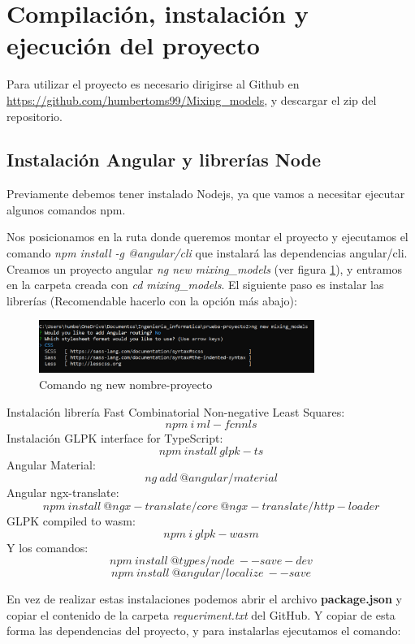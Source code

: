 \section{Compilación, instalación y ejecución del proyecto}

Para utilizar el proyecto es necesario dirigirse al Github en \url{https://github.com/humbertoms99/Mixing_models}, y descargar el zip del repositorio.

\subsection{Instalación Angular y librerías Node}

Previamente debemos tener instalado Nodejs, ya que vamos a necesitar ejecutar algunos comandos npm.

Nos posicionamos en la ruta donde queremos montar el proyecto y ejecutamos el comando \textit{npm install -g @angular/cli} que instalará las dependencias angular/cli.
Creamos un proyecto angular \textit{ng new mixing\_models} (ver figura \ref{fig:ng_new}), y entramos en la carpeta creada con \textit{cd mixing\_models}. El siguiente paso es instalar las librerías (Recomendable hacerlo con la opción más abajo): \\


\begin{figure}[h!] 
\centering
    \includegraphics[width=0.8\textwidth]{img/ng_new.PNG}
\caption{Comando ng new nombre-proyecto}
\label{fig:ng_new}
\end{figure}

Instalación librería Fast Combinatorial Non-negative Least Squares:
$$ npm\:i\:ml-fcnnls $$
Instalación GLPK interface for TypeScript:
$$ npm\:install\:glpk-ts $$
Angular Material:
$$ ng\:add\:@angular/material  $$
Angular ngx-translate:
$$ npm\:install\:@ngx-translate/core\:@ngx-translate/http-loader $$
GLPK compiled to wasm:
$$ npm\:i\:glpk-wasm $$
Y los comandos:
$$ npm\:install\:@types/node\:--save-dev $$
$$ npm\:install\:@angular/localize\:--save $$

En vez de realizar estas instalaciones podemos abrir el archivo \textbf{package.json} y copiar el contenido de la carpeta \textit{requeriment.txt} del GitHub. Y copiar de esta forma las dependencias del proyecto, y para instalarlas ejecutamos el comando:

